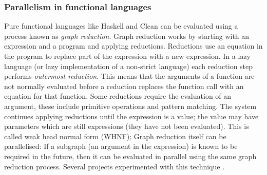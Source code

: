 
\subsubsection{Parallelism in functional languages}
\label{sec:intro_par_func}


Pure functional languages like Haskell and Clean can be evaluated using a
process known as \emph{graph reduction}.
Graph reduction works by starting with an expression and a program and
applying reductions.
Reductions use an equation in the program to replace part of the expression
with a new expression.
In a lazy language (or lazy implementation of a non-strict language)
each reduction step performs \emph{outermost reduction}.
This means that the arguments of a function are not normally evaluated
before a reduction replaces the function call with an equation for that
function.
Some reductions require the evaluation of an argument,
these include primitive operations and pattern matching.
The system continues applying reductions until the expression is
a value;
the value may have parameters which are still expressions (they have not
been evaluated).
This is called weak head normal form (WHNF);
Graph reduction itself can be parallelised:
If a subgraph (an argument in the expression) is known to be required in the
future,
then it can be evaluated in parallel using the same graph reduction process.
Several projects experimented with this technique
\citep{augustsson:1989:parallel-graph-reduction,burn:1989:parallel-reduction-machine,peyton-jones:1989:parallel-graph-reduction}.


